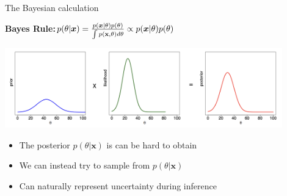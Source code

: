 \documentclass{beamer}					%
\begin{document}
\begin{frame}{The Bayesian calculation}


\textbf{Bayes Rule:}\;\;$p(\theta\lvert \boldsymbol{x}) = \frac{p(\boldsymbol{x}\lvert \theta)p(\theta)}{\int p(\bold{x},\theta)d\theta} \propto p(\boldsymbol{x}\lvert \theta)p(\theta)$
\vspace{0.75cm}

\includegraphics[width=12cm]{../../dissertation/dissertation/media/BayesRule.png}
\vspace{0.5cm}

\begin{itemize}
\item The posterior $p(\theta\lvert \boldsymbol{x})$ is can be hard to obtain
\item We can instead try to sample from $p(\theta\lvert \boldsymbol{x})$
\item Can naturally represent uncertainty during inference
\end{itemize}

\end{frame}


\end{document}
